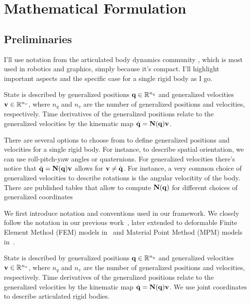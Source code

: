 \section{Mathematical Formulation}
\label{sec:optimization_framework}

\subsection{Preliminaries}

I'll use notation from the articulated body dynamics community
\cite{bib:featherstone2008_rigid_body_dynamics_algorithms,bib:jain2010_robot_multibody_dynamics},
which is most used in robotics and graphics, simply because it's compact. I'll
highlight important aspects and the specific case for a single rigid body as I
go.

State is described by generalized positions ${\mathbf{q}} \in \mathbb{R}^{n_q}$ and
generalized velocities ${\mathbf{v}} \in \mathbb{R}^{n_v}$, where $n_q$ and $n_v$ are the
number of generalized positions and velocities, respectively. Time derivatives
of the generalized positions relate to the generalized velocities by the kinematic map
$\dot{{\mathbf{q}}} = {\mathbf{N}}({\mathbf{q}}){\mathbf{v}}$. 

There are several options to choose from to define generalized positions and
velocities for a single rigid body. For instance, to describe spatial
orientation, we can use roll-pitch-yaw angles or quaternions. For generalized
velocities there's notice that $\dot{{\mathbf{q}}} = {\mathbf{N}}({\mathbf{q}}){\mathbf{v}}$ allows for
${\mathbf{v}} \ne \dot{{\mathbf{q}}} $. For instance, a very common choice of generalized
velocities to describe rotations is the angular velocitity of the body. There
are published tables that allow to compute ${\mathbf{N}}({\mathbf{q}})$ for different
choices of generalized coordinates 



We first introduce notation and conventions used in our framework. We closely
follow the notation in our previous work~\cite{bib:castro2022unconstrained,bib:masterjohn2021discrete},
later extended to deformable Finite Element Method (FEM) models in~\cite{bib:han2023}
and Material Point Method (MPM) models in~\cite{bib:zong2024_convex_mpm}.

State is described by generalized positions ${\mathbf{q}} \in \mathbb{R}^{n_q}$ and
generalized velocities ${\mathbf{v}} \in \mathbb{R}^{n_v}$, where $n_q$ and $n_v$ are the
number of generalized positions and velocities, respectively. Time derivatives
of the generalized positions relate to the generalized velocities by the kinematic map
$\dot{{\mathbf{q}}} = {\mathbf{N}}({\mathbf{q}}){\mathbf{v}}$. We use joint coordinates to describe
articulated rigid bodies.

